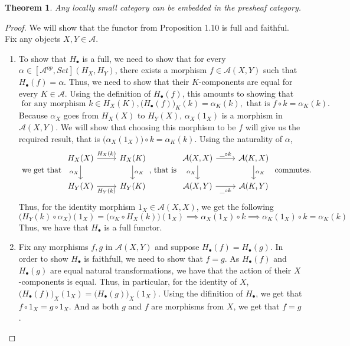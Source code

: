 \documentclass[18pt,a4paper]{article}
\newtheorem{theorem}{Theorem}[section]
\theoremstyle{definition}
\begin{document}
\begin{theorem}
	Any locally small category can be embedded in the presheaf category.
\end{theorem}
\begin{proof} \setcounter{equation}{0}
	We will show that the functor from Proposition 1.10 is
	full and faithful. Fix any objects $X,Y \in \mathcal{A}$.
	\begin{enumerate}[label=\Roman*]
		\item To show that $H_\bullet$ is a full, we need to show that for every $\alpha
			\in [\mathcal{A} ^{op},Set](H_X,H_Y)$, there exists a morphism
			$f\in \mathcal{A} (X,Y)$ such that $H_\bullet(f)=\alpha$. Thus, we need
			to show that their $K$-components are equal for every $K \in \mathcal{A}$.
			Using the definition of $H_\bullet(f)$, this amounts to showing that
			\begin{equation}  \text{ for any morphism } k \in H_X(K),
				\Big(H_\bullet(f)\Big)_K^{}(k)=\alpha_K(k), \text{ that is }
				f\circ k=\alpha_K(k).
		\end{equation}
		Because $\alpha_X$ goes from $H_X(X)$ to $H_Y(X)$, $\alpha_X(1_X)$ is a morphism
		in $\mathcal{A}(X,Y)$. We will show that choosing this morphism to be $f$
		will give us the required result, that is $\big( \alpha_X(1_X) \big) \circ
		k=\alpha_K(k)$. Using the naturality of $\alpha$,
		\[ \text{ we get that }
		\begin{tikzcd}
		H_X(X) \arrow[swap]{d}{\alpha_X} \arrow{r}{H_X(k)}
			& H_X(K) \arrow{d}{\alpha_K}\\
		H_Y(X) \arrow[swap]{r}{H_Y(k)}
			& H_Y(K)
		\end{tikzcd}
		\text{, that is }
		\begin{tikzcd}
			\mathcal{A} (X,X) \arrow[swap]{d}{\alpha_X} \arrow{r}{\string _ \circ k}
			& \mathcal{A} (K,X) \arrow{d}{\alpha_K}\\
			\mathcal{A} (X,Y) \arrow[swap]{r}{\string _ \circ k}
			& \mathcal{A} (K,Y)
		\end{tikzcd}
		\text{ commutes. }\]
		Thus, for the identity morphism $1_X \in \mathcal{A} (X,X)$, we get the following
		\[ \Big(H_Y(k) \circ \alpha_X\Big)(1_X)=\Big(\alpha_K \circ H_X(k)\Big)(1_X)
			\implies  \alpha_X(1_X) \circ k \implies
		\alpha_K(1_X) \circ k=\alpha_K(k)\]
		Thus, we have that $H_\bullet$ is a full functor.

	\item  Fix any morphisms $f,g$ in $\mathcal{A} (X,Y)$ and suppose
		$H_\bullet(f)=H_\bullet(g)$. In order to show $H_\bullet$ is faithfull,
		we need to show that $f=g$. As $H_\bullet(f)$ and $H_\bullet(g)$ are equal natural
		transformations, we have that the action of their $X$-components is equal. Thus,
		in particular, for the identity of $X$, $\big(H_\bullet(f) \big)_X (1_X)
		= \big(H_\bullet(g) \big)_X (1_X)$. Using the difinition of $H_\bullet$, we get
		that $f \circ 1_X = g \circ 1_X$. And as both $g$ and $f$ are morphisms
		from $X$, we get that $f=g$.
	\end{enumerate}
\end{proof}
\end{document}
